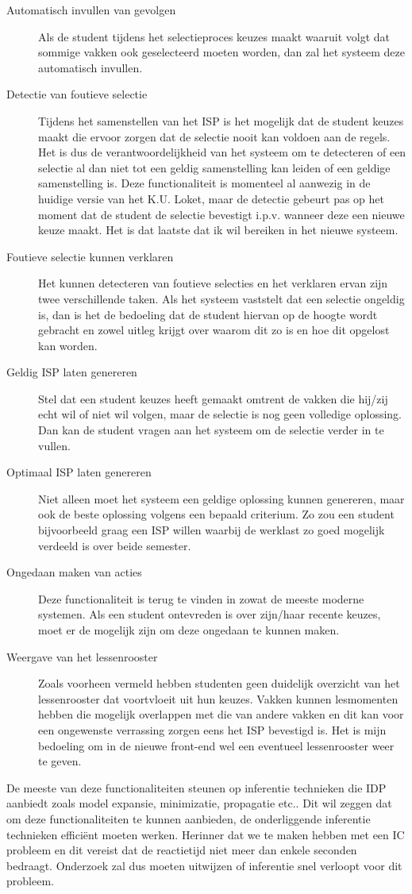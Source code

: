 \begin{description}
\item[Automatisch invullen van gevolgen] Als de student tijdens het selectieproces keuzes maakt waaruit volgt dat sommige vakken ook geselecteerd moeten worden, dan zal het systeem deze automatisch invullen.
\item[Detectie van foutieve selectie] Tijdens het samenstellen van het ISP is het mogelijk dat de student keuzes maakt die ervoor zorgen dat de selectie nooit kan voldoen aan de regels. Het is dus de verantwoordelijkheid van het systeem om te detecteren of een selectie al dan niet tot een geldig samenstelling kan leiden of een geldige samenstelling is. Deze functionaliteit is momenteel al aanwezig in de huidige versie van het K.U. Loket, maar de detectie gebeurt pas op het moment dat de student de selectie bevestigt i.p.v. wanneer deze een nieuwe keuze maakt. Het is dat laatste dat ik wil bereiken in het nieuwe systeem.
\item[Foutieve selectie kunnen verklaren] Het kunnen detecteren van foutieve selecties en het verklaren ervan zijn twee verschillende taken. Als het systeem vaststelt dat een selectie ongeldig is, dan is het de bedoeling dat de student hiervan op de hoogte wordt gebracht en zowel uitleg krijgt over waarom dit zo is en hoe dit opgelost kan worden.
\item[Geldig ISP laten genereren] Stel dat een student keuzes heeft gemaakt omtrent de vakken die hij/zij echt wil of niet wil volgen, maar de selectie is nog geen volledige oplossing. Dan kan de student vragen aan het systeem om de selectie verder in te vullen.
\item[Optimaal ISP laten genereren] Niet alleen moet het systeem een geldige oplossing kunnen genereren, maar ook de beste oplossing volgens een bepaald criterium. Zo zou een student bijvoorbeeld graag een ISP willen waarbij de werklast zo goed mogelijk verdeeld is over beide semester. 
\item[Ongedaan maken van acties] Deze functionaliteit is terug te vinden in zowat de meeste moderne systemen. Als een student ontevreden is over zijn/haar recente keuzes, moet er de mogelijk zijn om deze ongedaan te kunnen maken. 
\item[Weergave van het lessenrooster] Zoals voorheen vermeld hebben studenten geen duidelijk overzicht van het lessenrooster dat voortvloeit uit hun keuzes. Vakken kunnen lesmomenten hebben die mogelijk overlappen met die van andere vakken en dit kan voor een ongewenste verrassing zorgen eens het ISP bevestigd is. Het is mijn bedoeling om in de nieuwe front-end wel een eventueel lessenrooster weer te geven.
\end{description}
De meeste van deze functionaliteiten steunen op inferentie technieken die IDP aanbiedt zoals model expansie, minimizatie, propagatie etc.. Dit wil zeggen dat om deze functionaliteiten te kunnen aanbieden, de onderliggende inferentie technieken effici\"{e}nt moeten werken. Herinner dat we te maken hebben met een IC probleem en dit vereist dat de reactietijd niet meer dan enkele seconden bedraagt. Onderzoek zal dus moeten uitwijzen of inferentie snel verloopt voor dit probleem.

